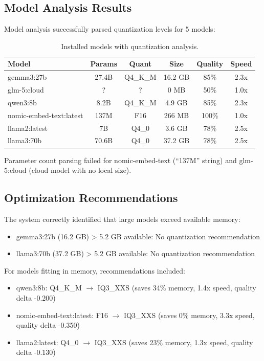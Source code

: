 \documentclass[journal]{IEEEtran}
\begin{document}
\subsection{Model Analysis Results}

Model analysis successfully parsed quantization levels for 5 models:
\begin{table}[htbp]
\centering
\caption{Installed models with quantization analysis.}
\label{tab:models}
\begin{tabular}{lccccc}
\hline
Model & Params & Quant & Size & Quality & Speed \\
\hline
gemma3:27b & 27.4B & Q4\_K\_M & 16.2 GB & 85\% & 2.3x \\
glm-5:cloud & ? & ? & 0 MB & 50\% & 1.0x \\
qwen3:8b & 8.2B & Q4\_K\_M & 4.9 GB & 85\% & 2.3x \\
nomic-embed-text:latest & 137M & F16 & 266 MB & 100\% & 1.0x \\
llama2:latest & 7B & Q4\_0 & 3.6 GB & 78\% & 2.5x \\
llama3:70b & 70.6B & Q4\_0 & 37.2 GB & 78\% & 2.5x \\
\hline
\end{tabular}
\end{table}

Parameter count parsing failed for nomic-embed-text (``137M'' string) and glm-5:cloud (cloud model with no local size).

\subsection{Optimization Recommendations}

The system correctly identified that large models exceed available memory:
\begin{itemize}
    \item gemma3:27b (16.2 GB) > 5.2 GB available: No quantization recommendation
    \item llama3:70b (37.2 GB) > 5.2 GB available: No quantization recommendation
\end{itemize}

For models fitting in memory, recommendations included:
\begin{itemize}
    \item qwen3:8b: Q4\_K\_M $\rightarrow$ IQ3\_XXS (saves 34\% memory, 1.4x speed, quality delta -0.200)
    \item nomic-embed-text:latest: F16 $\rightarrow$ IQ3\_XXS (saves 0\% memory, 3.3x speed, quality delta -0.350)
    \item llama2:latest: Q4\_0 $\rightarrow$ IQ3\_XXS (saves 23\% memory, 1.3x speed, quality delta -0.130)
\end{itemize}
\end{document}
